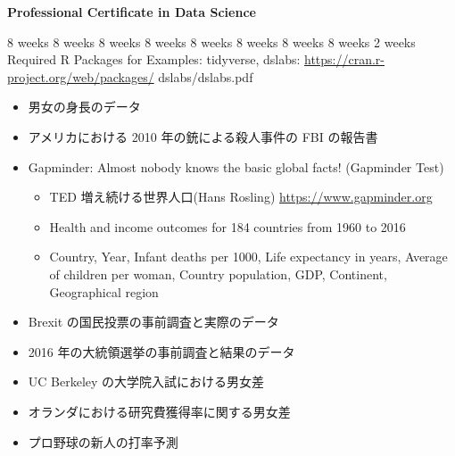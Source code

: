 \documentclass[
]{bxjsbook}
\providecommand{\tightlist}{%
  \setlength{\itemsep}{0pt}\setlength{\parskip}{0pt}}
\theoremstyle{definition}
\theoremstyle{definition}
\theoremstyle{definition}
\theoremstyle{definition}
\theoremstyle{remark}
\begin{document}
\textbf{Professional Certificate in Data Science}

8 weeks 8 weeks 8 weeks 8 weeks 8 weeks 8 weeks 8 weeks 8 weeks 2 weeks
Required R Packages for Examples: tidyverse, dslabs: \url{https://cran.r-project.org/web/packages/} dslabs/dslabs.pdf

\begin{itemize}
\tightlist
\item
  男女の身長のデータ
\item
  アメリカにおける 2010 年の銃による殺人事件の FBI の報告書
\item
  Gapminder: Almost nobody knows the basic global facts! (Gapminder Test)

  \begin{itemize}
  \tightlist
  \item
    TED 増え続ける世界人口(Hans Rosling) \url{https://www.gapminder.org}
  \item
    Health and income outcomes for 184 countries from 1960 to 2016
  \item
    Country, Year, Infant deaths per 1000, Life expectancy in years, Average of children per woman,
    Country population, GDP, Continent, Geographical region
  \end{itemize}
\item
  Brexit の国民投票の事前調査と実際のデータ
\item
  2016 年の大統領選挙の事前調査と結果のデータ
\item
  UC Berkeley の大学院入試における男女差
\item
  オランダにおける研究費獲得率に関する男女差
\item
  プロ野球の新人の打率予測
\end{itemize}
\end{document}
